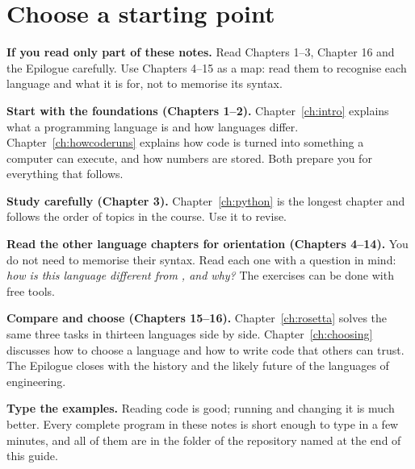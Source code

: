 \section*{Choose a starting point}
\textbf{If you read only part of these notes.} Read Chapters 1--3, Chapter 16 and the
Epilogue carefully. Use Chapters 4--15 as a map: read them to recognise each language and
what it is for, not to memorise its syntax.
\par\textbf{Start with the foundations (Chapters 1--2).} Chapter~\ref{ch:intro} explains what a
programming language is and how languages differ. Chapter~\ref{ch:howcoderuns} explains how
code is turned into something a computer can execute, and how numbers are stored. Both
prepare you for everything that follows.
\par\textbf{Study \py carefully (Chapter 3).} Chapter~\ref{ch:python} is the longest
chapter and follows the order of topics in the course. Use it to revise.
\par\textbf{Read the other language chapters for orientation (Chapters 4--14).} You do not
need to memorise their syntax. Read each one with a question in mind: \emph{how is this
language different from \py, and why?} The exercises can be done with free tools.
\par\textbf{Compare and choose (Chapters 15--16).} Chapter~\ref{ch:rosetta} solves the same
three tasks in thirteen languages side by side. Chapter~\ref{ch:choosing} discusses how to
choose a language and how to write code that others can trust. The Epilogue closes with
the history and the likely future of the languages of engineering.
\par\textbf{Type the examples.} Reading code is good; running and changing it is much
better. Every complete program in these notes is short enough to type in a few minutes,
and all of them are in the  folder of the repository named at the end of this
guide.

